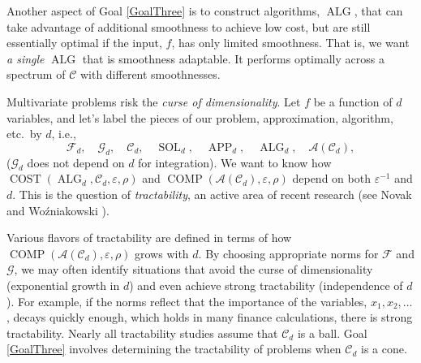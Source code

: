 \documentclass[11pt]{NSFamsart}
\DeclareMathOperator{\cost}{COST}
\DeclareMathOperator{\comp}{COMP}
\DeclareMathOperator{\SOL}{SOL}
\DeclareMathOperator{\APP}{APP}
\DeclareMathOperator{\ALG}{ALG}
\newcommand{\cc}{\mathcal{C}}
\newcommand{\cala}{{\mathcal{A}}}
\newcommand{\calc}{{\mathcal{C}}}
\newcommand{\calf}{{\mathcal{F}}}
\newcommand{\calg}{{\mathcal{G}}}
\begin{document}
Another aspect of Goal \ref{GoalThree} is to construct algorithms, $\ALG$, that can take advantage of additional smoothness to achieve low cost, but are still essentially optimal if the input, $f$, has only limited smoothness.  That is, we want \emph{a single} $\ALG$ that is smoothness adaptable.  It performs optimally across a spectrum of  $\calc$ with different smoothnesses.

Multivariate problems risk the \emph{curse of dimensionality}.  Let $f$ be a function of $d$ variables, and let's label the pieces of our problem, approximation, algorithm, etc.\ by $d$, i.e., 
\begin{equation*}
    \calf_d, \quad \calg_d, \quad \calc_d, \quad \SOL_d, \quad \APP_d,\quad \ALG_d, \quad \cala(\calc_d),
\end{equation*}
($\calg_d$ does not depend on $d$ for integration).  We want to know how $\cost(\ALG_d, \calc_d, \varepsilon,\rho)$ and $\comp(\cala(\cc_d), \varepsilon,\rho)$ depend on both $\varepsilon^{-1}$ and $d$.  This is the question of \emph{tractability}, an active area of recent research (see  Novak and Wo\'zniakowski \cite{NovWoz08a,NovWoz10a,NovWoz12a}).

Various flavors of tractability are defined in terms of how  $\comp(\cala(\cc_d), \varepsilon,\rho)$ grows with $d$.  By choosing appropriate norms for $\calf$ and $\calg$, we may often identify situations that avoid the curse of dimensionality (exponential growth in $d$) and even achieve strong tractability (independence of $d$).   For example, if the norms reflect that the importance of the variables, $x_1, x_2, \ldots$, decays quickly enough, which holds in many finance calculations, there is strong tractability.  Nearly all tractability studies assume that $\calc_d$ is a ball.  Goal \ref{GoalThree} involves determining the tractability of problems when $\calc_d$ is a cone.
\end{document}
